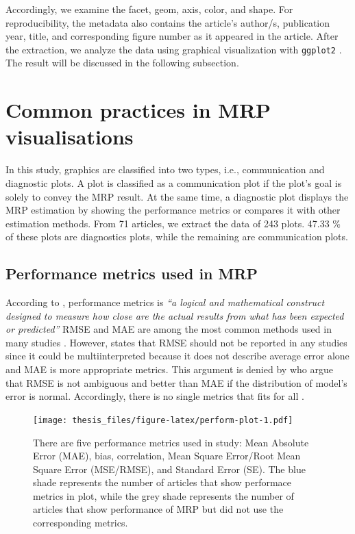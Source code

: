 \documentclass{monashthesis}
\begin{document}
Accordingly, we examine the facet, geom, axis, color, and shape. For reproducibility, the metadata also contains the article's author/s, publication year, title, and corresponding figure number as it appeared in the article. After the extraction, we analyze the data using graphical visualization with \texttt{ggplot2} \autocite{ggplot2}. The result will be discussed in the following subsection.

\hypertarget{common-practices-in-mrp-visualisations}{%
\section{Common practices in MRP visualisations}\label{common-practices-in-mrp-visualisations}}

In this study, graphics are classified into two types, i.e., communication and diagnostic plots. A plot is classified as a communication plot if the plot's goal is solely to convey the MRP result. At the same time, a diagnostic plot displays the MRP estimation by showing the performance metrics or compares it with other estimation methods. From 71 articles, we extract the data of 243 plots. 47.33 \% of these plots are diagnostics plots, while the remaining are communication plots.

\hypertarget{performance-metrics-used-in-mrp}{%
\subsection{Performance metrics used in MRP}\label{performance-metrics-used-in-mrp}}

According to \textcite{BotchkarevAlexei2019ANTD}, performance metrics is \emph{``a logical and mathematical construct designed to measure how close are the actual results from what has been expected or predicted''} RMSE and MAE are among the most common methods used in many studies \autocite{BotchkarevAlexei2019ANTD}. However, \textcite{WillmottCJ2005Aotm} states that RMSE should not be reported in any studies since it could be multiinterpreted because it does not describe average error alone and MAE is more appropriate metrics. This argument is denied by \textcite{ChaiT2014Rmse} who argue that RMSE is not ambiguous and better than MAE if the distribution of model's error is normal. Accordingly, there is no single metrics that fits for all \autocite{ChaiT2014Rmse}.

\begin{figure}
\centering
\texttt{[image: thesis\_files/figure-latex/perform-plot-1.pdf]}
\caption{\label{fig:perform-plot}There are five performance metrics used in study: Mean Absolute Error (MAE), bias, correlation, Mean Square Error/Root Mean Square Error (MSE/RMSE), and Standard Error (SE). The blue shade represents the number of articles that show performace metrics in plot, while the grey shade represents the number of articles that show performance of MRP but did not use the corresponding metrics.}
\end{figure}
\end{document}
